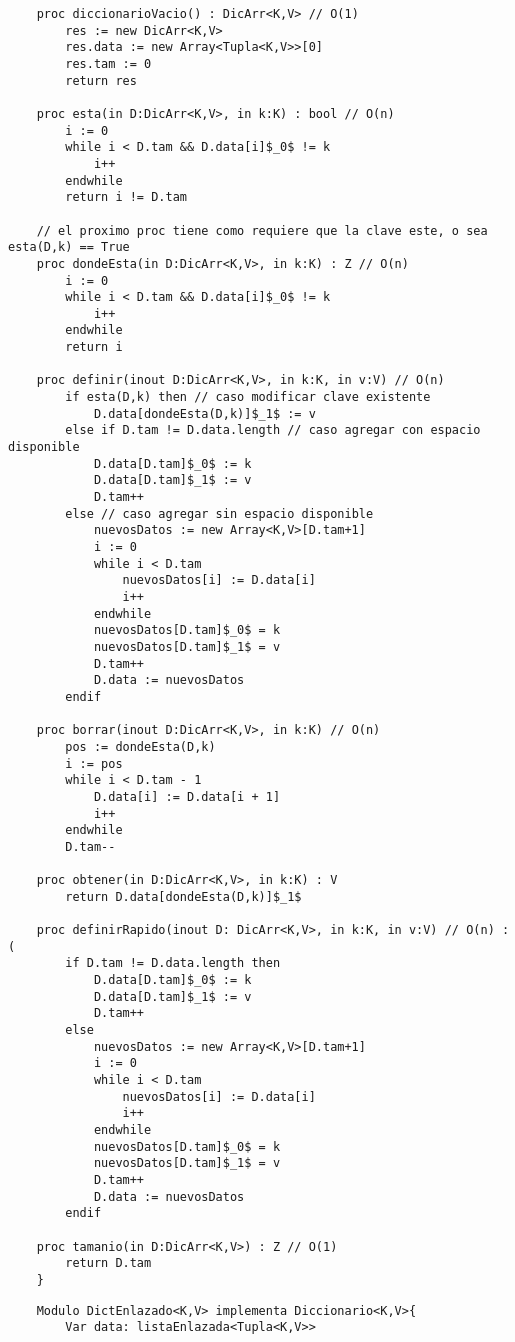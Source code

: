 \documentclass[10pt,a4paper]{article}
\begin{document}
{}

\begin{lstlisting}
	proc diccionarioVacio() : DicArr<K,V> // O(1)
		res := new DicArr<K,V>
		res.data := new Array<Tupla<K,V>>[0]
		res.tam := 0
		return res
	
	proc esta(in D:DicArr<K,V>, in k:K) : bool // O(n)
		i := 0
		while i < D.tam && D.data[i]$_0$ != k
			i++
		endwhile
		return i != D.tam

	// el proximo proc tiene como requiere que la clave este, o sea esta(D,k) == True
	proc dondeEsta(in D:DicArr<K,V>, in k:K) : Z // O(n)
		i := 0 
		while i < D.tam && D.data[i]$_0$ != k
			i++
		endwhile
		return i

	proc definir(inout D:DicArr<K,V>, in k:K, in v:V) // O(n)
		if esta(D,k) then // caso modificar clave existente
			D.data[dondeEsta(D,k)]$_1$ := v
		else if D.tam != D.data.length // caso agregar con espacio disponible
			D.data[D.tam]$_0$ := k
			D.data[D.tam]$_1$ := v
			D.tam++
		else // caso agregar sin espacio disponible 
			nuevosDatos := new Array<K,V>[D.tam+1]
			i := 0 
			while i < D.tam 
				nuevosDatos[i] := D.data[i]
				i++
			endwhile
			nuevosDatos[D.tam]$_0$ = k
			nuevosDatos[D.tam]$_1$ = v
			D.tam++
			D.data := nuevosDatos
		endif

	proc borrar(inout D:DicArr<K,V>, in k:K) // O(n)
		pos := dondeEsta(D,k)
		i := pos
		while i < D.tam - 1
			D.data[i] := D.data[i + 1]
			i++
		endwhile
		D.tam--
		
	proc obtener(in D:DicArr<K,V>, in k:K) : V
		return D.data[dondeEsta(D,k)]$_1$

	proc definirRapido(inout D: DicArr<K,V>, in k:K, in v:V) // O(n) :(
		if D.tam != D.data.length then 
			D.data[D.tam]$_0$ := k
			D.data[D.tam]$_1$ := v
			D.tam++
		else 
			nuevosDatos := new Array<K,V>[D.tam+1]
			i := 0 
			while i < D.tam 
				nuevosDatos[i] := D.data[i]
				i++
			endwhile
			nuevosDatos[D.tam]$_0$ = k
			nuevosDatos[D.tam]$_1$ = v
			D.tam++
			D.data := nuevosDatos
		endif
	
	proc tamanio(in D:DicArr<K,V>) : Z // O(1)
		return D.tam
	}
\end{lstlisting}


\begin{lstlisting}
	Modulo DictEnlazado<K,V> implementa Diccionario<K,V>{
		Var data: listaEnlazada<Tupla<K,V>>
\end{lstlisting}
\end{document}
